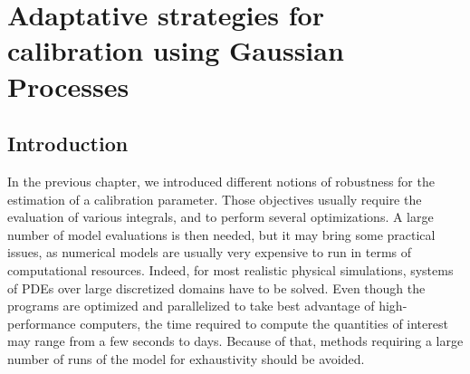 \documentclass[../../Main_ManuscritThese.tex]{subfiles}
\begin{document}
\chapter{Adaptative strategies for calibration using Gaussian Processes}
\label{chap:adaptative_design_gp}
\minitoc
\newpage
\subfileLocal{\pagestyle{contentStyle}}



\section{Introduction}

In the previous chapter, we introduced different notions of robustness for the estimation of a calibration parameter. Those objectives usually require the evaluation of various integrals, and to perform several optimizations. A large number of model evaluations is then needed, but it may bring some practical issues, as numerical models are usually very expensive to run in terms of computational resources. Indeed, for most realistic physical simulations, systems of PDEs over large discretized domains have to be solved. Even though the programs are optimized and parallelized to take best advantage of high-performance computers, the time required to compute the quantities of interest may range from a few seconds to days. Because of that, methods requiring a large number of runs of the model for exhaustivity should be avoided.


\end{document}
